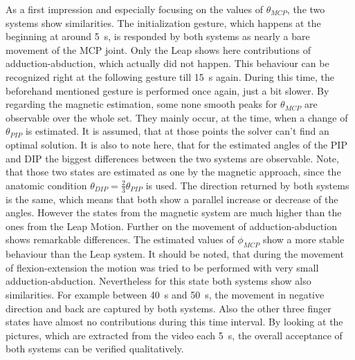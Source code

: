 As a first impression and especially focusing on the values of $ \theta_{MCP} $, the two systems show similarities. The initialization gesture, which happens at the beginning at around \SI{5}{\second}, is responded by both systems as nearly a bare movement of the \ac{MCP} joint. Only the Leap shows here contributions of adduction-abduction, which actually did not happen. This behaviour can be recognized right at the following gesture till \SI{15}{\second} again. During this time, the beforehand mentioned gesture is performed once again, just a bit slower. By regarding the magnetic estimation, some none smooth peaks for $ \theta_{MCP} $ are observable over the whole set. They mainly occur, at the time, when a change of $ \theta_{PIP} $ is estimated. It is assumed, that at those points the solver can't find an optimal solution. It is also to note here, that for the estimated angles of the \ac{PIP} and \ac{DIP} the biggest differences between the two systems are observable. Note, that those two states are estimated as one by the magnetic approach, since the anatomic condition $ \theta_{DIP} = \frac{2}{3} \theta_{PIP} $ is used. The direction returned by both systems is the same, which means that both show a parallel increase or decrease of the angles. However the states from the magnetic system are much higher than the ones from the Leap Motion. Further on the movement of adduction-abduction shows remarkable differences. The estimated values of $ \phi_{MCP} $ show a more stable behaviour than the Leap system. It should be noted, that during the movement of flexion-extension the motion was tried to be performed with very small adduction-abduction. Nevertheless for this state both systems show also similarities. For example between \SI{40}{\second} and \SI{50}{\second}, the movement in negative direction and back are captured by both systems. Also the other three finger states have almost no contributions during this time interval. By looking at the pictures, which are extracted from the video each \SI{5}{\second}, the overall acceptance of both systems can be verified qualitatively.
